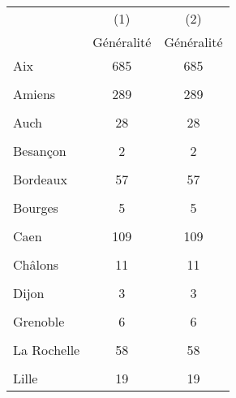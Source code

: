 {
\def\sym#1{\ifmmode^{#1}\else\(^{#1}\)\fi}
\begin{tabular}{l*{2}{c}}
\hline\hline
            &\multicolumn{1}{c}{(1)}&\multicolumn{1}{c}{(2)}\\
            &\multicolumn{1}{c}{Généralité}&\multicolumn{1}{c}{Généralité}\\
\hline
Aix         &         685         &         685         \\
            &                     &                     \\
[1em]
Amiens      &         289         &         289         \\
            &                     &                     \\
[1em]
Auch        &          28         &          28         \\
            &                     &                     \\
[1em]
Besançon    &           2         &           2         \\
            &                     &                     \\
[1em]
Bordeaux    &          57         &          57         \\
            &                     &                     \\
[1em]
Bourges     &           5         &           5         \\
            &                     &                     \\
[1em]
Caen        &         109         &         109         \\
            &                     &                     \\
[1em]
Châlons     &          11         &          11         \\
            &                     &                     \\
[1em]
Dijon       &           3         &           3         \\
            &                     &                     \\
[1em]
Grenoble    &           6         &           6         \\
            &                     &                     \\
[1em]
La Rochelle &          58         &          58         \\
            &                     &                     \\
[1em]
Lille       &          19         &          19         \\

\end{tabular}}

